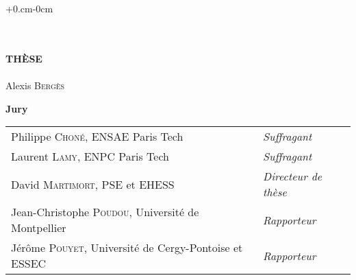 
\begin{titlepage}
\thispagestyle{empty}
\begin{adjustwidth}{+0.cm}{-0cm}
\begin{center}
 \\
\vspace*{3.5cm}
 \\
\vspace*{2.5cm}
\noindent \large \textbf{TH\`ESE} \\
\vspace*{0.4cm}
 \\
\vspace*{0.3cm}
\noindent \Large Alexis \textsc{Bergès} \\
\vspace*{2.5cm}
\end{center}
\begin{center}
\noindent \large \textbf{Jury} \\
\vspace{0.6cm}
\noindent \normalsize
\begin{tabular}{ll}
Philippe \textsc{Choné}, ENSAE Paris Tech & \textit{Suffragant} \\
Laurent \textsc{Lamy}, ENPC Paris Tech & \textit{Suffragant} \\
David \textsc{Martimort}, PSE et EHESS & \textit{Directeur de thèse}\\
Jean-Christophe \textsc{Poudou}, Université de Montpellier & \textit{Rapporteur} \\
Jérôme \textsc{Pouyet}, Université de Cergy-Pontoise et ESSEC & \textit{Rapporteur} \\
\end{tabular}
\end{center}

\end{adjustwidth}
\end{titlepage}


\cleardoublepage
\titlepage

